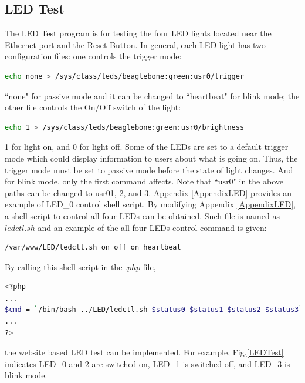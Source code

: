 \documentclass[12pt,journal,draftclsnofoot,onecolumn]{IEEEtran}
\begin{document}
\subsection{LED Test}\label{Led}
The LED Test program is for testing the four LED lights located near the Ethernet port and the Reset Button. In general, each LED light has two configuration files: one controls the trigger mode:
\begin{lstlisting}[language={bash}]
echo none > /sys/class/leds/beaglebone:green:usr0/trigger
\end{lstlisting}
``none" for passive mode and it can be changed to ``heartbeat" for blink mode; the other file controls the On/Off switch of the light:
\begin{lstlisting}[language={bash}]
echo 1 > /sys/class/leds/beaglebone:green:usr0/brightness
\end{lstlisting}
1 for light on, and 0 for light off. Some of the LEDs are set to a default trigger mode which could display information to users about what is going on. Thus, the trigger mode must be set to passive mode before the state of light changes. And for blink mode, only the first command affects. Note that ``usr0" in the above paths can be changed to usr01, 2, and 3. Appendix \ref{AppendixLED} provides an example of LED\_0 control shell script. By modifying Appendix \ref{AppendixLED}, a shell script to control all four LEDs can be obtained. Such file is named as $ledctl.sh$ and an example of the all-four LEDs control command is given:
\begin{lstlisting}[language={bash}]
/var/www/LED/ledctl.sh on off on heartbeat
\end{lstlisting}
By calling this shell script in the $.php$ file,
\begin{lstlisting}[language={bash}]
<?php
...
$cmd = `/bin/bash ../LED/ledctl.sh $status0 $status1 $status2 $status3`;
...
?>
\end{lstlisting}
the website based LED test can be implemented. For example, Fig.\ref{LEDTest} indicates LED\_0 and 2 are switched on, LED\_1 is switched off, and LED\_3 is blink mode.
\end{document}
